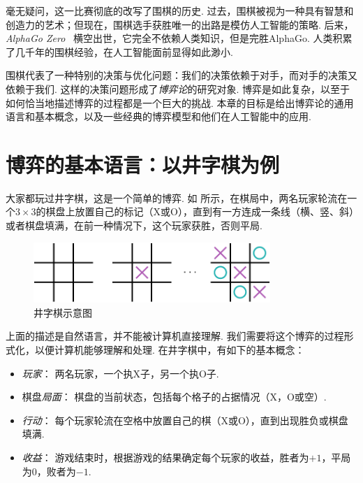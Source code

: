 毫无疑问，这一比赛彻底的改写了围棋的历史. 过去，围棋被视为一种具有智慧和创造力的艺术；但现在，围棋选手获胜唯一的出路是模仿人工智能的策略. 后来，\textit{AlphaGo Zero}~\cite{silverMasteringGameGo2017} 横空出世，它完全不依赖人类知识，但是完胜AlphaGo. 人类积累了几千年的围棋经验，在人工智能面前显得如此渺小. 

围棋代表了一种特别的决策与优化问题：我们的决策依赖于对手，而对手的决策又依赖于我们. 这样的决策问题形成了\textit{博弈论}的研究对象. 博弈是如此复杂，以至于如何恰当地描述博弈的过程都是一个巨大的挑战. 本章的目标是给出博弈论的通用语言和基本概念，以及一些经典的博弈模型和他们在人工智能中的应用.

\section{博弈的基本语言：以井字棋为例}\label{sec:game-basic}

大家都玩过井字棋，这是一个简单的博弈. 如 所示，在棋局中，两名玩家轮流在一个$3\times 3$的棋盘上放置自己的标记（X或O），直到有一方连成一条线（横、竖、斜）或者棋盘填满，在前一种情况下，这个玩家获胜，否则平局. 

\begin{figure}[ht]
    \centering
    \includegraphics[width=0.8\textwidth]{figures/game/tic-tac-toe-game.pdf}
    \caption{井字棋示意图}
    \label{fig:tic-tac-toe-game}
\end{figure}

上面的描述是自然语言，并不能被计算机直接理解. 我们需要将这个博弈的过程形式化，以便计算机能够理解和处理. 在井字棋中，有如下的基本概念：
\begin{itemize}
    \item \textit{玩家}： 两名玩家，一个执X子，另一个执O子.
    \item 棋盘\textit{局面}： 棋盘的当前状态，包括每个格子的占据情况（X，O或空）.
    \item \textit{行动}： 每个玩家轮流在空格中放置自己的棋（X或O），直到出现胜负或棋盘填满.
    \item \textit{收益}： 游戏结束时，根据游戏的结果确定每个玩家的收益，胜者为$+1$，平局为$0$，败者为$-1$.
\end{itemize}

